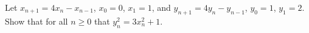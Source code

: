 Let $x_{n + 1} = 4x_n - x_{n - 1}$,  $x_0 = 0$,  $x_1 = 1$,  and $y_{n + 1} = 4y_n - y_{n - 1}$,  $y_0 = 1$,  $y_1 = 2$.  Show that for all $n \ge 0$ that $y_n^2 = 3x_n^2 + 1$.